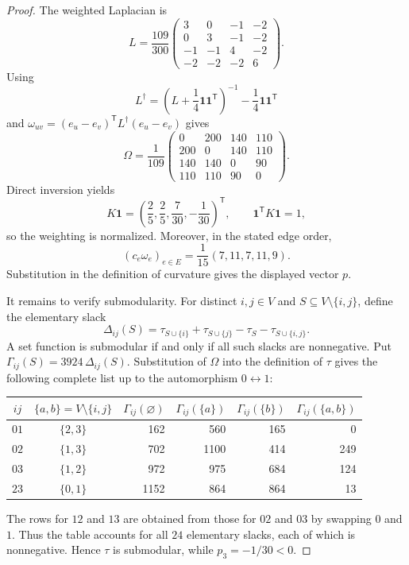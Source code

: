 \documentclass[11pt]{amsart}
\newcommand{\one}{\mathbf{1}}
\begin{document}
\begin{proof}
The weighted Laplacian is
\[
L=\frac{109}{300}
\begin{pmatrix}
 3& 0&-1&-2\\
 0& 3&-1&-2\\
-1&-1& 4&-2\\
-2&-2&-2& 6
\end{pmatrix}.
\]
Using
\[
L^{\dagger}
=
\left(L+\frac14\one\one^{\mathsf T}\right)^{-1}
-\frac14\one\one^{\mathsf T}
\]
and
$\omega_{uv}=(e_u-e_v)^{\mathsf T}L^{\dagger}(e_u-e_v)$ gives
\[
\Omega=\frac1{109}
\begin{pmatrix}
  0&200&140&110\\
200&  0&140&110\\
140&140&  0& 90\\
110&110& 90&  0
\end{pmatrix}.
\]
Direct inversion yields
\[
K\one=
\left(\frac25,\frac25,\frac7{30},-\frac1{30}\right)^{\mathsf T},
\qquad
\one^{\mathsf T}K\one=1,
\]
so the weighting is normalized. Moreover, in the stated edge order,
\[
(c_e\omega_e)_{e\in E}
=
\frac1{15}(7,11,7,11,9).
\]
Substitution in the definition of curvature gives the displayed vector
$p$.

It remains to verify submodularity. For distinct $i,j\in V$ and
$S\subseteq V\setminus\{i,j\}$, define the elementary slack
\[
\Delta_{ij}(S)
=
\tau_{S\cup\{i\}}+\tau_{S\cup\{j\}}
-\tau_S-\tau_{S\cup\{i,j\}}.
\]
A set function is submodular if and only if all such slacks are
nonnegative. Put $\Gamma_{ij}(S)=3924\,\Delta_{ij}(S)$. Substitution of
$\Omega$ into the definition of $\tau$ gives the following complete list
up to the automorphism $0\leftrightarrow1$:

\begin{center}
\small
\renewcommand{\arraystretch}{1.12}
\begin{tabular}{ccrrrr}
\toprule
$ij$ & $\{a,b\}=V\setminus\{i,j\}$
& $\Gamma_{ij}(\varnothing)$
& $\Gamma_{ij}(\{a\})$
& $\Gamma_{ij}(\{b\})$
& $\Gamma_{ij}(\{a,b\})$\\
\midrule
$01$ & $\{2,3\}$ & 162  & 560  & 165 & 0\\
$02$ & $\{1,3\}$ & 702  & 1100 & 414 & 249\\
$03$ & $\{1,2\}$ & 972  & 975  & 684 & 124\\
$23$ & $\{0,1\}$ & 1152 & 864  & 864 & 13\\
\bottomrule
\end{tabular}
\end{center}

The rows for $12$ and $13$ are obtained from those for $02$ and $03$ by
swapping $0$ and $1$. Thus the table accounts for all $24$ elementary
slacks, each of which is nonnegative. Hence $\tau$ is submodular, while
$p_3=-1/30<0$.
\end{proof}
\end{document}
